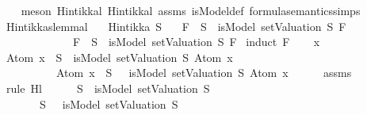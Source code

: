 \begin{isabellebody}
%
\isadelimproof
\ \ %
\endisadelimproof
%
\isatagproof
{}\isamarkupfalse%
\ {\isacharparenleft}meson\ Hintikka{\isacharunderscore}l{}\ Hintikka{\isacharunderscore}l{}\ assms\ isModel{\isacharunderscore}def\ formula{\isacharunderscore}semantics{\isachardot}simps{\isacharparenleft}{}{\isacharparenright}{\isacharparenright}%
\endisatagproof
{\isafoldproof}%
%
\isadelimproof
\isanewline
%
\endisadelimproof
\isanewline
{}\isamarkupfalse%
\ Hintikkas{\isacharunderscore}lemma{\isacharunderscore}l{}{\isacharcolon}\isanewline
\ \ \ {\isachardoublequoteopen}Hintikka\ S{\isachardoublequoteclose}\isanewline
\ \ \ {\isachardoublequoteopen}{\isacharparenleft}F\ {\isasymin}\ S\ {\isasymlongrightarrow}\ isModel\ {\isacharparenleft}setValuation\ S{\isacharparenright}\ F{\isacharparenright}\isanewline
\ \ \ \ \ \ \ \ \ \ \ {\isasymand}\ {\isacharparenleft}\isactrlbold {\isasymnot}\ F\ {\isasymin}\ S\ {\isasymlongrightarrow}\ {\isacharparenleft}{\isasymnot}{\isacharparenleft}isModel\ {\isacharparenleft}setValuation\ S{\isacharparenright}\ F{\isacharparenright}{\isacharparenright}{\isacharparenright}{\isachardoublequoteclose}\isanewline
%
\isadelimproof
%
\endisadelimproof
%
\isatagproof
{}\isamarkupfalse%
\ {\isacharparenleft}induct\ F{\isacharparenright}\isanewline
\ \ \isamarkupfalse%
\ x\isanewline
\ \ \isamarkupfalse%
\ {\isachardoublequoteopen}{\isacharparenleft}Atom\ x\ {\isasymin}\ S\ {\isasymlongrightarrow}\ isModel\ {\isacharparenleft}setValuation\ S{\isacharparenright}\ {\isacharparenleft}Atom\ x{\isacharparenright}{\isacharparenright}\ {\isasymand}\isanewline
\ \ \ \ \ \ \ \ \ {\isacharparenleft}\isactrlbold {\isasymnot}\ {\isacharparenleft}Atom\ x{\isacharparenright}\ {\isasymin}\ S\ {\isasymlongrightarrow}\ {\isasymnot}\ isModel\ {\isacharparenleft}setValuation\ S{\isacharparenright}\ {\isacharparenleft}Atom\ x{\isacharparenright}{\isacharparenright}{\isachardoublequoteclose}\isanewline
\ \ \ \ \isamarkupfalse%
\ assms\ \isamarkupfalse%
\ {\isacharparenleft}rule\ Hl{}{\isacharunderscore}{}{\isacharparenright}\isanewline
{}\isamarkupfalse%
\isanewline
\ \ \isamarkupfalse%
\ {\isachardoublequoteopen}{\isacharparenleft}{\isasymbottom}\ {\isasymin}\ S\ {\isasymlongrightarrow}\ isModel\ {\isacharparenleft}setValuation\ S{\isacharparenright}\ {\isasymbottom}{\isacharparenright}\ {\isasymand}\isanewline
\ \ \ \ {\isacharparenleft}\isactrlbold {\isasymnot}\ {\isasymbottom}\ {\isasymin}\ S\ {\isasymlongrightarrow}\ {\isasymnot}\ isModel\ {\isacharparenleft}setValuation\ S{\isacharparenright}\ {\isasymbottom}{\isacharparenright}{\isachardoublequoteclose}\ \isanewline

\end{isabellebody}
